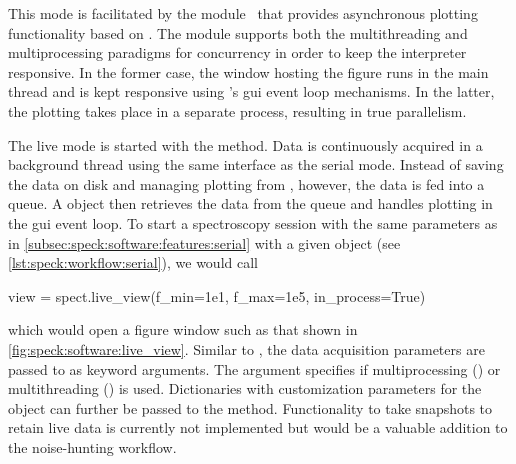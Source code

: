 This mode is facilitated by the  module~\cite{Hangleiter_qutil} that provides asynchronous plotting functionality based on \matplotlib.
The  module supports both the multithreading and multiprocessing paradigms for concurrency in order to keep the interpreter responsive.
In the former case, the window hosting the figure runs in the main thread and is kept responsive using \matplotlib's \gls{gui} event loop mechanisms.
In the latter, the plotting takes place in a separate process, resulting in true parallelism.

The live mode is started with the  method.
Data is continuously acquired in a background thread using the same  interface as the serial mode.
Instead of saving the data on disk and managing plotting from \pyspeck, however, the data is fed into a queue.
A  object then retrieves the data from the queue and handles plotting in the \gls{gui} event loop.
To start a spectroscopy session with the same parameters as in \cref{subsec:speck:software:features:serial} with a given  object (see \cref{lst:speck:workflow:serial}), we would call

\begin{pycode}
    view = spect.live_view(f_min=1e1, f_max=1e5, in_process=True)
\end{pycode}

which would open a figure window such as that shown in \cref{fig:speck:software:live_view}.
Similar to , the data acquisition parameters are passed to  as keyword arguments.
The  argument specifies if multiprocessing () or multithreading () is used.
Dictionaries with customization parameters for the  object can further be passed to the method.
Functionality to take snapshots to retain live data is currently not implemented but would be a valuable addition to the noise-hunting workflow.
